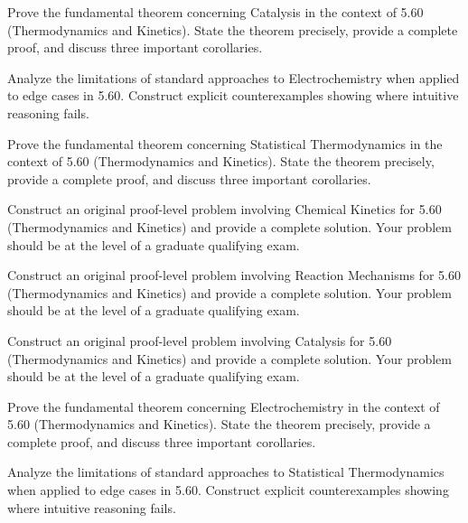 \documentclass[12pt,a4paper]{exam}
\begin{document}
\begin{questions}
\vspace{0.3cm}

\question[6]
Prove the fundamental theorem concerning Catalysis in the context of 5.60 (Thermodynamics and Kinetics). State the theorem precisely, provide a complete proof, and discuss three important corollaries.

\vspace{0.3cm}

\question[4]
Analyze the limitations of standard approaches to Electrochemistry when applied to edge cases in 5.60. Construct explicit counterexamples showing where intuitive reasoning fails.

\vspace{0.3cm}

\question[5]
Prove the fundamental theorem concerning Statistical Thermodynamics in the context of 5.60 (Thermodynamics and Kinetics). State the theorem precisely, provide a complete proof, and discuss three important corollaries.

\vspace{0.3cm}

\question[4]
Construct an original proof-level problem involving Chemical Kinetics for 5.60 (Thermodynamics and Kinetics) and provide a complete solution. Your problem should be at the level of a graduate qualifying exam.

\vspace{0.3cm}

\question[4]
Construct an original proof-level problem involving Reaction Mechanisms for 5.60 (Thermodynamics and Kinetics) and provide a complete solution. Your problem should be at the level of a graduate qualifying exam.

\vspace{0.3cm}

\question[3]
Construct an original proof-level problem involving Catalysis for 5.60 (Thermodynamics and Kinetics) and provide a complete solution. Your problem should be at the level of a graduate qualifying exam.

\vspace{0.3cm}

\question[2]
Prove the fundamental theorem concerning Electrochemistry in the context of 5.60 (Thermodynamics and Kinetics). State the theorem precisely, provide a complete proof, and discuss three important corollaries.

\vspace{0.3cm}

\question[4]
Analyze the limitations of standard approaches to Statistical Thermodynamics when applied to edge cases in 5.60. Construct explicit counterexamples showing where intuitive reasoning fails.


\end{questions}
\end{document}
